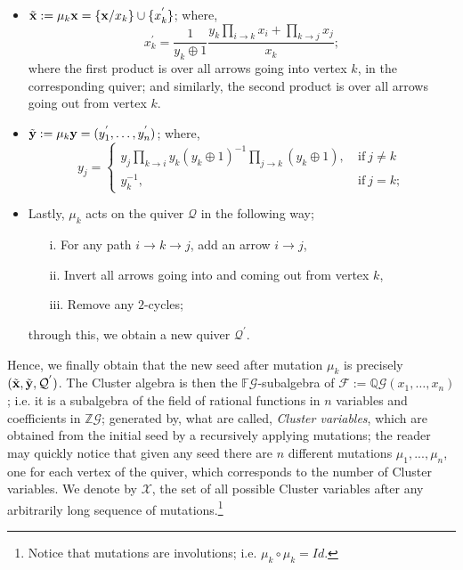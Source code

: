 \begin{itemize}
    \item $\Tilde{\mathbf{x}} :=\mu_k\mathbf{x} = \{\mathbf{x} / x_k\} \cup \{x_k^{'}\}$; where, 
        \begin{equation}
            x_k^{'} = \dfrac{1}{y_k \oplus 1}\dfrac{y_k\prod_{i \to k}x_i + \prod_{k \to j}x_j}{x_k};
        \end{equation}
        where the first product is over all arrows going into vertex $k$, in the corresponding quiver; and similarly, the second product is over all arrows going out from vertex $k$.
    \item $\Tilde{\mathbf{y}} := \mu_k\mathbf{y} = (y_1^{'},\dots,y_n^{'})$; where,
    \begin{equation*}
    y_j = 
        \begin{cases}
        y_j \prod_{k \to i}y_k(y_k \oplus 1)^{-1} \prod_{j \to k}(y_k \oplus 1),  \ &\text{if} \ j \ne k \\
        y_k^{-1}, &\text{if} \ j = k;
        \end{cases}
    \end{equation*}
    \item Lastly, $\mu_k$ acts on the quiver $\mathcal{Q}$ in the following way;
    \begin{itemize}
        \item[i.] For any path $i \to k \to j$, add an arrow $i \to j$,
        \item[ii.] Invert all arrows going into and coming out from vertex $k$,
        \item[iii.] Remove any $2$-cycles;
    \end{itemize}
    through this, we obtain a new quiver $\mathcal{Q}^{'}$.
\end{itemize}
Hence, we finally obtain that the new seed after mutation $\mu_k$ is precisely $(\Tilde{\mathbf{x}},\Tilde{\mathbf{y}}, \mathcal{Q}^{'})$. The Cluster algebra is then the  $\mathbb{F}\mathcal{G}$-subalgebra of $\mathcal{F}:= \mathbb{Q}\mathcal{G}(x_1,\dots,x_n)$; i.e. it is a subalgebra of the field of rational functions in $n$ variables and coefficients in $\mathbb{Z}\mathcal{G}$; generated by, what are called, \emph{Cluster variables}, which are obtained from the initial seed by a recursively applying mutations; the reader may quickly notice that given any seed there are $n$ different mutations $\mu_1, . . . , \mu_n$, one for each vertex of the quiver, which corresponds to the number of Cluster variables. We denote by $\mathcal{X}$, the set of all possible Cluster variables after any arbitrarily long sequence of mutations.\footnote[1]{Notice that mutations are involutions; i.e. $\mu_k\circ\mu_k =\textit{Id}$.}
